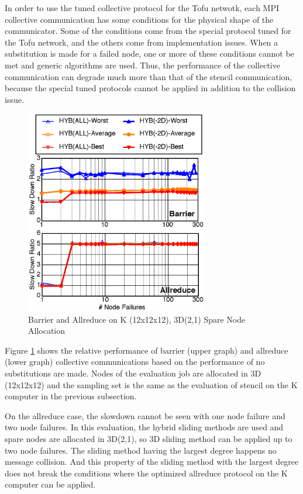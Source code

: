 \documentclass[Afour,times,sagev]{sagej}
\begin{document}
In order to use the tuned collective protocol for the Tofu netwotk,
each MPI collective communication has some conditions for the physical
shape of the communicator. Some of the conditions come from the
special protocol tuned for the Tofu network, and the others come from
implementation issues. When a substitution is made for a failed node,
one or more of these conditions cannot be met and generic algorithms
are used. Thus, the performance of the collective communication can
degrade much more than that of the stencil communication, because the
special tuned protocols cannot be applied in addition to the collision
issue.

\begin{figure}[ht]
\centering
\includegraphics[width=80mm]{Figs/K-Collective-CL.eps}
  \caption{Barrier and Allreduce on K (12x12x12), 3D(2,1) Spare Node
    Allocation}
  \label{fig:k-collective}
\end{figure}

Figure \ref{fig:k-collective} shows the relative performance of
barrier (upper graph) and allreduce (lower graph) collective
communications based on the performance of no substitutions are
made. Nodes of the evaluation job are allocated in 3D (12x12x12) and
the sampling set is the same as the evaluation of stencil on the
K computer in the previous subsection.

On the allreduce case, the slowdown cannot be seen with one node
failure and two node failures. In this evaluation, the hybrid sliding
methods are used and spare nodes are allocated in 3D(2,1), so 3D
sliding method can be applied up to two node failures. The sliding
method having the largest degree happens no message collision. And
this property of
the sliding method with the largest degree does not break the
conditions where the optimized allreduce protocol on the K computer
can be applied.
\end{document}

